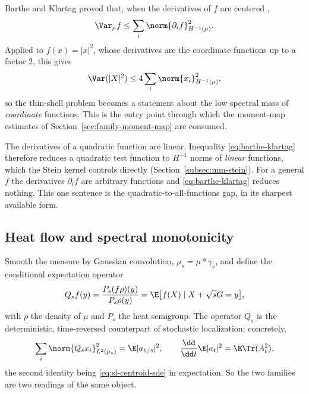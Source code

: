 \documentclass[../../main.tex]{subfiles}
\begin{document}
Barthe and Klartag proved that, when the derivatives of $f$ are centered
\cite{BartheKlartag2019SpectralGaps},
\begin{equation}
  \Var_\mu f\le\sum_i\norm{\partial_if}_{H^{-1}(\mu)}^2 .
  \label{eq:barthe-klartag}
\end{equation}
Applied to $f(x)=|x|^2$, whose derivatives are the coordinate functions up to a factor $2$, this
gives
\begin{equation}
  \Var(|X|^2)\le4\sum_i\norm{x_i}_{H^{-1}(\mu)}^2 ,
  \label{eq:bk-radial}
\end{equation}
so the thin-shell problem becomes a statement about the low spectral mass of \emph{coordinate}
functions. This is the entry point through which the moment-map estimates of
Section~\ref{sec:family-moment-map} are consumed.

\begin{remark}
\label{rem:quadratics-special}
The derivatives of a quadratic function are linear. Inequality \eqref{eq:barthe-klartag} therefore
reduces a quadratic test function to $H^{-1}$ norms of \emph{linear} functions, which the Stein
kernel controls directly (Section~\ref{subsec:mm-stein}). For a general $f$ the derivatives
$\partial_if$ are arbitrary functions and \eqref{eq:barthe-klartag} reduces nothing. This one
sentence is the quadratic-to-all-functions gap, in its sharpest available form.
\end{remark}

\subsection{Heat flow and spectral monotonicity}
\label{subsec:heat-flow}

Smooth the measure by Gaussian convolution, $\mu_s=\mu*\gamma_s$, and define the conditional
expectation operator
\begin{equation}
  Q_sf(y)=\frac{P_s(f\rho)(y)}{P_s\rho(y)}=\E\bigl[f(X)\mid X+\sqrt sG=y\bigr],
  \label{eq:Qs-def}
\end{equation}
with $\rho$ the density of $\mu$ and $P_s$ the heat semigroup. The operator $Q_s$ is the
deterministic, time-reversed counterpart of stochastic localization; concretely,
\begin{equation}
  \sum_i\norm{Q_sx_i}_{L^2(\mu_s)}^2=\E|a_{1/s}|^2,
  \qquad
  \frac{\dd}{\dd t}\E|a_t|^2=\E\Tr(A_t^2),
  \label{eq:Qs-localization-dictionary}
\end{equation}
the second identity being \eqref{eq:sl-centroid-sde} in expectation. So the two families are two
readings of the same object.
\end{document}
